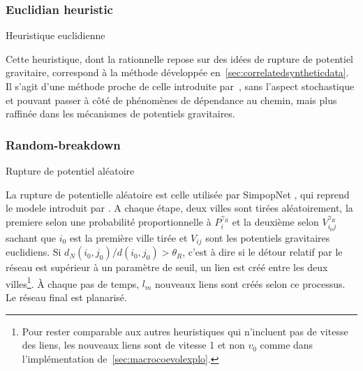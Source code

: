 
\subsubsection{Euclidian heuristic}{Heuristique euclidienne}



Cette heuristique, dont la rationnelle repose sur des idées de rupture de potentiel gravitaire, correspond à la méthode développée en~\ref{sec:correlatedsyntheticdata}. Il s'agit d'une méthode proche de celle introduite par~\cite{schmitt2014modelisation}, sans l'aspect stochastique et pouvant passer à côté de phénomènes de dépendance au chemin, mais plus raffinée dans les mécanismes de potentiels gravitaires.



\subsubsection{Random-breakdown}{Rupture de potentiel aléatoire}

La rupture de potentielle aléatoire est celle utilisée par SimpopNet \cite{schmitt2014modelisation}, qui reprend le modele introduit par \cite{blumenfeld2010network}. A chaque étape, deux villes sont tirées aléatoirement, la premiere selon une probabilité proportionnelle à $P_i^{\gamma_R}$ et la deuxième selon $V_{i_0j}^{\gamma_R}$ sachant que $i_0$ est la première ville tirée et $V_{ij}$ sont les potentiels gravitaires euclidiens. Si $d_N(i_0,j_0) / d(i_0,j_0) > \theta_R$, c'est à dire si le détour relatif par le réseau est supérieur à un paramètre de seuil, un lien est créé entre les deux villes\footnote{Pour rester comparable aux autres heuristiques qui n'incluent pas de vitesse des liens, les nouveaux liens sont de vitesse 1 et non $v_0$ comme dans l'implémentation de~\ref{sec:macrocoevolexplo}.}. À chaque pas de temps, $l_m$ nouveaux liens sont créés selon ce processus. Le réseau final est planarisé.







